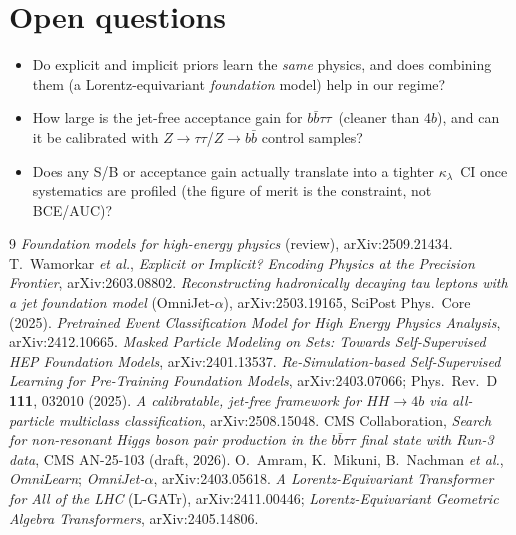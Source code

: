 \documentclass[11pt]{article}
\newcommand{\kl}{\ensuremath{\kappa_\lambda}}
\newcommand{\bbtt}{\ensuremath{b\bar b\tau\tau}}
\begin{document}
\section{Open questions}
\begin{itemize}
\item Do explicit and implicit priors learn the \emph{same} physics, and does
  combining them (a Lorentz-equivariant \emph{foundation} model) help in our regime?
\item How large is the jet-free acceptance gain for \bbtt\ (cleaner than $4b$), and
  can it be calibrated with $Z\to\tau\tau$/$Z\to b\bar b$ control samples?
\item Does any S/B or acceptance gain actually translate into a tighter \kl\ CI once
  systematics are profiled (the figure of merit is the constraint, not BCE/AUC)?
\end{itemize}

\begin{thebibliography}{9}\small
{} \emph{Foundation models for high-energy physics} (review),
  arXiv:2509.21434.
 T.~Wamorkar \emph{et al.}, \emph{Explicit or Implicit? Encoding
  Physics at the Precision Frontier}, arXiv:2603.08802.
 \emph{Reconstructing hadronically decaying tau leptons with a
  jet foundation model} (OmniJet-$\alpha$), arXiv:2503.19165, SciPost Phys.\ Core (2025).
 \emph{Pretrained Event Classification Model for High Energy Physics
  Analysis}, arXiv:2412.10665.
 \emph{Masked Particle Modeling on Sets: Towards Self-Supervised HEP
  Foundation Models}, arXiv:2401.13537.
 \emph{Re-Simulation-based Self-Supervised Learning for Pre-Training
  Foundation Models}, arXiv:2403.07066; Phys.\ Rev.\ D \textbf{111}, 032010 (2025).
 \emph{A calibratable, jet-free framework for $HH\to4b$ via
  all-particle multiclass classification}, arXiv:2508.15048.
 CMS Collaboration, \emph{Search for non-resonant Higgs boson pair
  production in the $\bbtt$ final state with Run-3 data}, CMS AN-25-103 (draft, 2026).
 O.~Amram, K.~Mikuni, B.~Nachman \emph{et al.}, \emph{OmniLearn};
  \emph{OmniJet-$\alpha$}, arXiv:2403.05618.
 \emph{A Lorentz-Equivariant Transformer for All of the LHC} (L-GATr),
  arXiv:2411.00446; \emph{Lorentz-Equivariant Geometric Algebra Transformers},
  arXiv:2405.14806.
\end{thebibliography}
\end{document}
